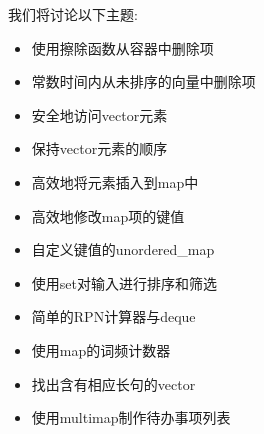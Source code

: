 我们将讨论以下主题:

\begin{itemize}
\item 
使用擦除函数从容器中删除项

\item 
常数时间内从未排序的向量中删除项

\item 
安全地访问vector元素

\item 
保持vector元素的顺序

\item 
高效地将元素插入到map中

\item 
高效地修改map项的键值

\item 
自定义键值的unordered\_map

\item 
使用set对输入进行排序和筛选

\item 
简单的RPN计算器与deque

\item 
使用map的词频计数器

\item 
找出含有相应长句的vector

\item 
使用multimap制作待办事项列表
\end{itemize}












